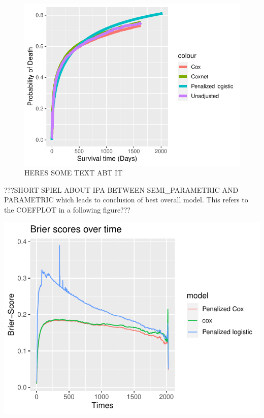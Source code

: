 \documentclass[
]{jss}
\begin{document}
\begin{CodeChunk}
\begin{figure}

{\centering \includegraphics{../figures/unnamed-chunk-2-1} 

}

\caption{\label{fig:cs3Final} HERES SOME TEXT ABT IT}\label{fig:unnamed-chunk-2}
\end{figure}
\end{CodeChunk}

???SHORT SPIEL ABOUT IPA BETWEEN SEMI\_PARAMETRIC AND PARAMETRIC which
leads to conclusion of best overall model. This refers to the COEFPLOT
in a following figure???

\begin{CodeChunk}


\begin{center}\includegraphics{../figures/finalBrierplot-1} \end{center}

\end{CodeChunk}
\end{document}
